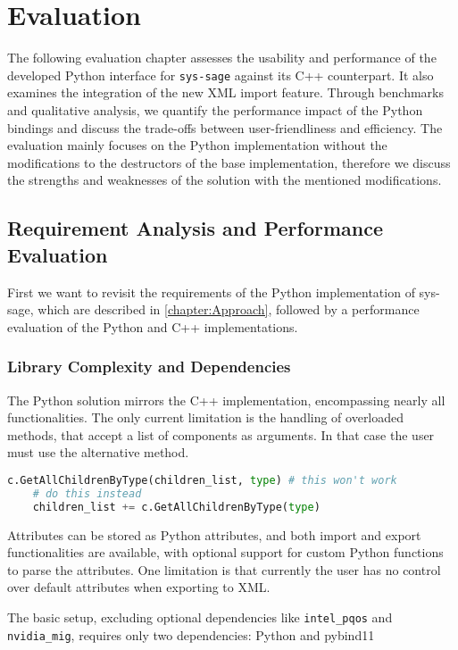 \chapter{Evaluation}\label{chapter:Evaluation}

The following evaluation chapter assesses the usability and performance of the developed Python interface for \texttt{sys-sage} against its C++ counterpart. It also examines the integration of the new XML import feature. Through benchmarks and qualitative analysis, we quantify the performance impact of the Python bindings and discuss the trade-offs between user-friendliness and efficiency. The evaluation mainly focuses on the Python implementation without the modifications to the destructors of the base implementation, therefore we discuss the strengths and weaknesses of the solution with the mentioned modifications.

\section{Requirement Analysis and Performance Evaluation}
First we want to revisit the requirements of the Python implementation of sys-sage, which are described in \autoref{chapter:Approach}, followed by a performance evaluation of the Python and C++ implementations.
\subsection{Library Complexity and Dependencies}

The Python solution mirrors the C++ implementation, encompassing nearly all functionalities. The only current limitation is the handling of overloaded methods, that accept a list of components as arguments. In that case the user must use the alternative method. 
\begin{lstlisting}[language=Python, xleftmargin=4em, frame = single]
    c.GetAllChildrenByType(children_list, type) # this won't work
    # do this instead 
    children_list += c.GetAllChildrenByType(type)
    \end{lstlisting}

Attributes can be stored as Python attributes, and both import and export functionalities are available, with optional support for custom Python functions to parse the attributes. One limitation is that currently the user has no control over default attributes when exporting to XML. 

The basic setup, excluding optional dependencies like \texttt{intel\_pqos} and \texttt{nvidia\_mig}, requires only two dependencies: Python and pybind11

